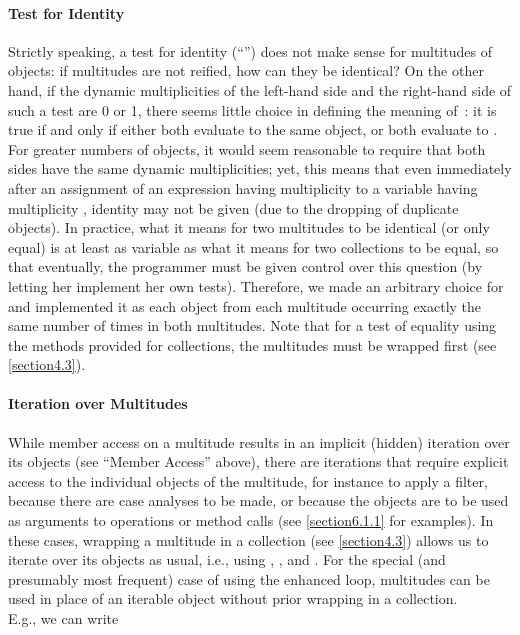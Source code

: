 {\paragraph{Test for Identity} Strictly speaking, a test for identity (``\inline{==}'') does
not make sense for multitudes of objects: if multitudes are not reified, how
can they be identical? On the other hand, if the dynamic multiplicities of
the left-hand side and the right-hand side of such a test are 0 or 1, there
seems little choice in defining the meaning of \inline{==}\,: it is true if and only if
either both evaluate to the same object, or both evaluate to .
For greater numbers of objects, it would seem reasonable to require that
both sides have the same dynamic multiplicities; yet, this means that even
immediately after an assignment of an expression having multiplicity
 to a variable having multiplicity ,
identity may not be given (due to the dropping of duplicate objects). In
practice, what it means for two multitudes to be identical (or only equal)
is at least as variable as what it means for two collections to be equal, so
that eventually, the programmer must be given control over this question (by
letting her implement her own tests). Therefore, we made an arbitrary choice
for \inline{==} and implemented it as each object from each multitude occurring
exactly the same number of times in both multitudes. Note that for a test of
equality using the  methods provided for collections, the
multitudes must be wrapped first (see \autoref{section4.3}).

\paragraph{Iteration over Multitudes} While member access on a multitude results in an
implicit (hidden) iteration over its objects (see ``Member Access''
above), there are iterations that require explicit access to the individual
objects of the multitude, for instance to apply a filter, because there are
case analyses to be made, or because the objects are to be used as arguments
to operations or method calls (see \autoref{section6.1.1} for examples). In these
cases, wrapping a multitude in a collection (see \autoref{section4.3}) allows us to
iterate over its objects as usual, i.e., using , ,
and . For the special (and presumably most frequent) case of using
the enhanced  loop, multitudes can be used in place of an iterable
object without prior wrapping in a collection.\\%
E.g., we can write

}
